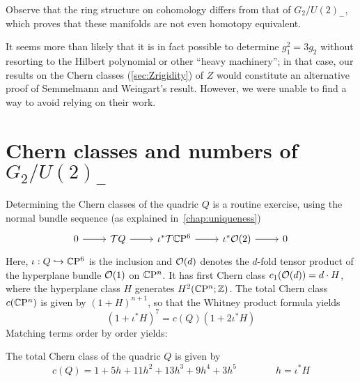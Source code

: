 \begin{rem}\leavevmode
	\begin{numberedlist}
		\item Observe that the ring structure on cohomology differs from that of $G_2/U(2)_-$, which proves that these manifolds are not even homotopy equivalent.
		\item It seems more than likely that it is in fact possible to determine $g_1^2=3g_2$ without resorting to the Hilbert polynomial or other ``heavy machinery''; in that case, our results on the Chern classes (\cref{sec:Zrigidity}) of $Z$ would constitute an alternative proof of Semmelmann and Weingart's result. However, we were unable to find a way to avoid relying on their work. 
	\end{numberedlist}
\end{rem}

\section{Chern classes and numbers of \texorpdfstring{$G_2/U(2)_-$}{the quadric}}

Determining the Chern classes of the quadric $Q$ is a routine exercise, using the normal bundle sequence (as explained in~\cref{chap:uniqueness})
\begin{equation*}
	\begin{tikzcd}
		0 \ar[r] & \mc T Q \ar[r] & \iota^*\mc T\CP^6 \ar[r] & \iota^*\mc O(2) \ar[r] & 0
	\end{tikzcd}
\end{equation*}
Here, $\iota:Q\hookrightarrow \mathbb{C}\mathrm{P}^6$ is the inclusion and $\mathcal{O}(d)$ denotes the $d$-fold tensor product of the hyperplane bundle $\mathcal{O}(1)$ on $\mathbb{C}\mathrm{P}^n$. It has first Chern class $c_1(\mathcal{O}(d))=d\cdot H$, where the hyperplane class $H$ generates $H^2(\mathbb{C}\mathrm{P}^n;\mathbb{Z})$. The total Chern class $c(\mathbb{C}\mathrm{P}^n)$ is given by $(1+H)^{n+1}$, so that the Whitney product formula yields
\begin{equation*}
	(1+\iota^*H)^7=c(Q)(1+2\iota^*H)
\end{equation*}
Matching terms order by order yields:

\begin{prop}
	The total Chern class of the quadric $Q$ is given by
	\begin{equation*}
		c(Q)=1+5h+11h^2+13h^3+9h^4+3h^5\qquad \qquad h=\iota^*H
	\end{equation*}\proofclear
\end{prop}

